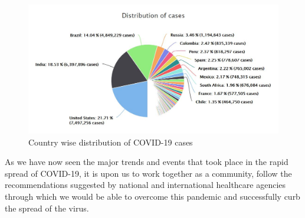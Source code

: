    
\begin{figure}[H]
    \centering
    \includegraphics[width=15cm]{Images/casesDist.JPG}
    \decoRule
    \caption[Distribution of COVID-19 Cases]{Country wise distribution of COVID-19 cases \cite{WMR2020}}
    \label{fig:COVID-19 Cases Country Wise Distribution}
    \end{figure}

    As we have now seen the major trends and events that took place in the rapid spread of COVID-19, it is upon us to work together as a community, follow the recommendations suggested by national and international healthcare agencies through which we would be able to overcome this pandemic and successfully curb the spread of the virus.